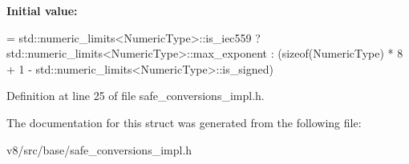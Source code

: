 {\bfseries Initial value\+:}
\begin{DoxyCode}
= std::numeric\_limits<NumericType>::is\_iec559
                               ? std::numeric\_limits<NumericType>::max\_exponent
                               : (\textcolor{keyword}{sizeof}(NumericType) * 8 + 1 -
                                  std::numeric\_limits<NumericType>::is\_signed)
\end{DoxyCode}


Definition at line 25 of file safe\+\_\+conversions\+\_\+impl.\+h.



The documentation for this struct was generated from the following file\+:\begin{DoxyCompactItemize}
\item 
v8/src/base/safe\+\_\+conversions\+\_\+impl.\+h\end{DoxyCompactItemize}
